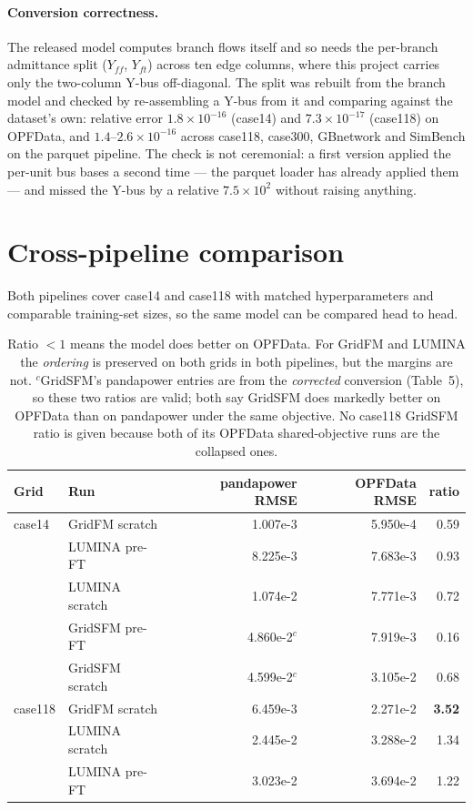 \documentclass[10pt]{article}
\begin{document}
\paragraph{Conversion correctness.} The released model computes branch flows
itself and so needs the per-branch admittance split (\(Y_{ff}\), \(Y_{ft}\))
across ten edge columns, where this project carries only the two-column Y-bus
off-diagonal. The split was rebuilt from the branch model and checked by
re-assembling a Y-bus from it and comparing against the dataset's own: relative
error \(1.8\times10^{-16}\) (case14) and \(7.3\times10^{-17}\) (case118) on
OPFData, and \(1.4\)--\(2.6\times10^{-16}\) across case118, case300, GBnetwork
and SimBench on the parquet pipeline. The check is not ceremonial: a first
version applied the per-unit bus bases a second time --- the parquet loader has
already applied them --- and missed the Y-bus by a relative \(7.5\times10^{2}\)
without raising anything.

\section{Cross-pipeline comparison}
\label{sec:cross}

Both pipelines cover case14 and case118 with matched hyperparameters and
comparable training-set sizes, so the same model can be compared head to head.

\begin{table}[H]
\centering
\small
\begin{tabular}{llrrr}
\toprule
Grid & Run & pandapower RMSE & OPFData RMSE & ratio \\
\midrule
case14 & GridFM scratch  & 1.007e-3 & 5.950e-4 & 0.59 \\
       & LUMINA pre-FT   & 8.225e-3 & 7.683e-3 & 0.93 \\
       & LUMINA scratch  & 1.074e-2 & 7.771e-3 & 0.72 \\
       & GridSFM pre-FT  & 4.860e-2$^{c}$ & 7.919e-3 & 0.16 \\
       & GridSFM scratch & 4.599e-2$^{c}$ & 3.105e-2 & 0.68 \\
\midrule
case118 & GridFM scratch & 6.459e-3 & 2.271e-2 & \textbf{3.52} \\
        & LUMINA scratch & 2.445e-2 & 3.288e-2 & 1.34 \\
        & LUMINA pre-FT  & 3.023e-2 & 3.694e-2 & 1.22 \\
\bottomrule
\end{tabular}
\label{tab:cross}
\caption{Ratio \(<1\) means the model does better on OPFData. For
GridFM and LUMINA the \emph{ordering} is preserved on both grids in both
pipelines, but the margins are not. $^{c}$GridSFM's pandapower entries are from
the \emph{corrected} conversion (Table~5), so these two ratios are valid; both
say GridSFM does markedly better on OPFData than on pandapower under the same
objective. No case118 GridSFM ratio is given because both of its OPFData
shared-objective runs are the collapsed ones.}
\end{table}
\end{document}
